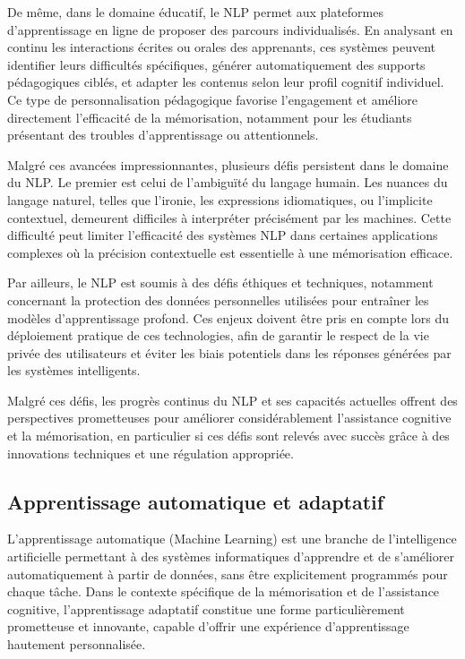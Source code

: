 \documentclass[11pt,a4paper]{report}
\begin{document}
De même, dans le domaine éducatif, le NLP permet aux plateformes d’apprentissage en ligne de proposer des parcours individualisés. En analysant en continu les interactions écrites ou orales des apprenants, ces systèmes peuvent identifier leurs difficultés spécifiques, générer automatiquement des supports pédagogiques ciblés, et adapter les contenus selon leur profil cognitif individuel. Ce type de personnalisation pédagogique favorise l'engagement et améliore directement l'efficacité de la mémorisation, notamment pour les étudiants présentant des troubles d’apprentissage ou attentionnels.

Malgré ces avancées impressionnantes, plusieurs défis persistent dans le domaine du NLP. Le premier est celui de l'ambiguïté du langage humain. Les nuances du langage naturel, telles que l’ironie, les expressions idiomatiques, ou l'implicite contextuel, demeurent difficiles à interpréter précisément par les machines. Cette difficulté peut limiter l’efficacité des systèmes NLP dans certaines applications complexes où la précision contextuelle est essentielle à une mémorisation efficace.

Par ailleurs, le NLP est soumis à des défis éthiques et techniques, notamment concernant la protection des données personnelles utilisées pour entraîner les modèles d’apprentissage profond. Ces enjeux doivent être pris en compte lors du déploiement pratique de ces technologies, afin de garantir le respect de la vie privée des utilisateurs et éviter les biais potentiels dans les réponses générées par les systèmes intelligents.

Malgré ces défis, les progrès continus du NLP et ses capacités actuelles offrent des perspectives prometteuses pour améliorer considérablement l’assistance cognitive et la mémorisation, en particulier si ces défis sont relevés avec succès grâce à des innovations techniques et une régulation appropriée.

\subsection{Apprentissage automatique et adaptatif}

L'apprentissage automatique (Machine Learning) est une branche de l’intelligence artificielle permettant à des systèmes informatiques d’apprendre et de s'améliorer automatiquement à partir de données, sans être explicitement programmés pour chaque tâche. Dans le contexte spécifique de la mémorisation et de l’assistance cognitive, l'apprentissage adaptatif constitue une forme particulièrement prometteuse et innovante, capable d’offrir une expérience d’apprentissage hautement personnalisée.
\end{document}
